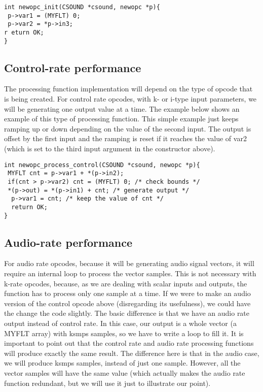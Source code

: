 \documentclass[11pt]{article}
\begin{document}
\begin{lstlisting}
int newopc_init(CSOUND *csound, newopc *p){
 p->var1 = (MYFLT) 0;
 p->var2 = *p->in3;
r eturn OK;
}
\end{lstlisting}

\subsection{Control-rate performance}

The processing function implementation will depend on the type of opcode that is being created. For control rate opcodes, with k- or i-type input parameters, we will be generating one output value at a time. The example below shows an example of this type of processing function. This simple example just keeps ramping up or down depending on the value of the second input. The output is offset by the first input and the ramping is reset if it reaches the value of var2 (which is set to the third input argument in the constructor above). 

\begin{lstlisting}
int newopc_process_control(CSOUND *csound, newopc *p){
 MYFLT cnt = p->var1 + *(p->in2);
 if(cnt > p->var2) cnt = (MYFLT) 0; /* check bounds */
 *(p->out) = *(p->in1) + cnt; /* generate output */
  p->var1 = cnt; /* keep the value of cnt */
  return OK;
}
\end{lstlisting}

\subsection{Audio-rate performance}

For audio rate opcodes, because it will be generating audio signal vectors, it will require an internal loop to process the vector samples. This is not necessary with k-rate opcodes, because, as we are dealing with scalar inputs and outputs,  the function has to process only one sample at a time. If we were to make an audio version of the control opcode above (disregarding its usefulness), we could have the change the code slightly. The basic difference is that we have an audio rate output instead of control rate. In this case, our output is a whole vector (a MYFLT array) with ksmps samples, so we have to write a loop to fill it. It is important to point out that the control rate and audio rate processing functions will produce exactly the same result. The difference here is that in the audio case, we will produce ksmps samples, instead of just one  sample. However, all the vector samples will have the same value (which actually makes the audio rate function redundant, but we will use it just to illustrate our point).
\end{document}

